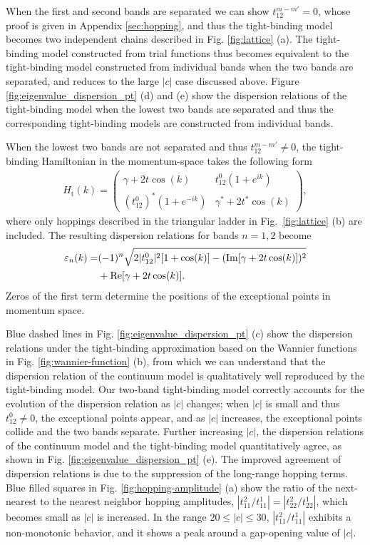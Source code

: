 \documentclass[prb,superscriptaddress,floatfix,twocolumn,showpacs]{revtex4-2}
\begin{document}
When the first and second bands are separated we can show $t_{12}^{m-m'} = 0$, whose proof is given in Appendix \ref{sec:hopping}, and thus the tight-binding model becomes two independent chains described in Fig. \ref{fig:lattice} (a).
The tight-binding model constructed from trial functions thus becomes equivalent to the tight-binding model constructed from individual bands when the two bands are separated, and reduces to the large $|c|$ case discussed above.
Figure \ref{fig:eigenvalue_dispersion_pt} (d) and (e) show the dispersion relations of the tight-binding model when the lowest two bands are separated and thus the corresponding tight-binding models are constructed from individual bands. 

When the lowest two bands are not separated and thus $t_{12}^{m-m'} \neq 0$, the tight-binding Hamiltonian in the momentum-space takes the following form
\begin{align}
    H_\text{t} (k)
    =
    \begin{pmatrix}
    \gamma + 2t\cos (k) & t^0_{12} (1 + e^{ik}) \\
    (t^0_{12})^* (1 + e^{-ik}) & \gamma^* + 2t^* \cos (k)
    \end{pmatrix},
        \label{eq:pt-symmetric_lattice-hamiltonian_truncated}
\end{align}
where only hoppings described in the triangular ladder in Fig.~\ref{fig:lattice} (b) are included.
The resulting dispersion relations for bands $n = 1,2$ become
\begin{align}
    \varepsilon_{n} (k) = &(-1)^n \sqrt{2|t_{12}^0|^2 [1 + \cos (k)] - (\mathrm{Im}[\gamma + 2t \cos (k)])^2} \notag \\
    &+\mathrm{Re}[\gamma + 2t\cos(k)].
\end{align}
Zeros of the first term determine the positions of the exceptional points in momentum space. 

Blue dashed lines in Fig. \ref{fig:eigenvalue_dispersion_pt} (c) show the dispersion relations under the tight-binding approximation based on the Wannier functions in Fig. \ref{fig:wannier-function} (b), from which we can understand that the dispersion relation of the continuum model is qualitatively well reproduced by the tight-binding model. 
Our two-band tight-binding model correctly accounts for the evolution of the dispersion relation as $|c|$ changes; when $|c|$ is small and thus $t_{12}^0 \neq 0$, the exceptional points appear, and as $|c|$ increases, the exceptional points collide and the two bands separate.
Further increasing $|c|$, the dispersion relations of the continuum model and the tight-binding model quantitatively agree, as shown in Fig. \ref{fig:eigenvalue_dispersion_pt} (e). 
The improved agreement of dispersion relations is due to the suppression of the long-range hopping terms. 
Blue filled squares in Fig. \ref{fig:hopping-amplitude} (a) show the ratio of the next-nearest to the nearest neighbor hopping amplitudes,  $|t_{11}^2/t_{11}^1|=|t_{22}^2/t_{22}^1|$, which becomes small as $|c|$ is increased. 
In the range $20\leq|c|\leq30$, $|t_{11}^2/t_{11}^1|$ exhibits a non-monotonic behavior, and it shows a peak around a gap-opening value of $|c|$.
\end{document}
